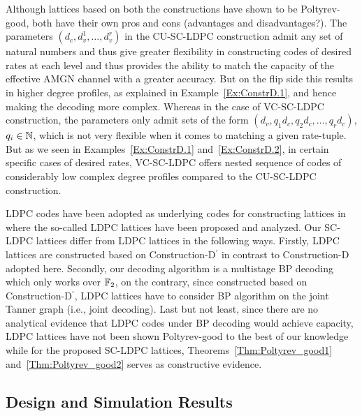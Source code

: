 \documentclass[journal,twocolumn]{IEEEtran}
\begin{document}
\begin{Discussion}
Although lattices based on both the constructions have shown to be Poltyrev-good, both have their own pros and cons (advantages and disadvantages?). The parameters $(d_{c},d_{v}^{1},\ldots,d_{v}^{r})$ in the CU-SC-LDPC construction admit any set of natural numbers and thus give greater flexibility in constructing codes of desired rates at each level and thus provides the ability to match the capacity of the effective AMGN channel with a greater accuracy. But on the flip side this results in higher degree profiles, as explained in Example~\ref{Ex:ConstrD.1}, and hence making the decoding more complex.  Whereas in the case of VC-SC-LDPC construction, the parameters only admit sets of the form $(d_{v},q_{1}d_{c},q_{2}d_{c},\ldots,q_{r}d_{c})$, $q_{i}\in\mathbb{N}$, which is not very flexible when it comes to  matching a given rate-tuple. But as we seen in Examples~\ref{Ex:ConstrD.1} and~\ref{Ex:ConstrD.2}, in certain specific cases of desired rates, VC-SC-LDPC offers nested sequence of codes of considerably low complex degree profiles compared to the CU-SC-LDPC construction.
\end{Discussion}

\begin{Remark}
    LDPC codes have been adopted as underlying codes for constructing lattices in \cite{sadeghi06} where the so-called LDPC lattices have been proposed and analyzed. Our SC-LDPC lattices differ from LDPC lattices in the following ways. Firstly, LDPC lattices are constructed based on Construction-D$^{\prime}$ \cite{BarnesSloane83} in contrast to Construction-D adopted here. Secondly, our decoding algorithm is a multistage BP decoding which only works over $\mathbb{F}_2$, on the contrary, since constructed based on Construction-D$^{\prime}$, LDPC lattices have to consider BP algorithm on the joint Tanner graph \cite{Banihashemi01} (i.e., joint decoding). Last but not least, since there are no analytical evidence that LDPC codes under BP decoding would achieve capacity, LDPC lattices have not been shown Poltyrev-good to the best of our knowledge while for the proposed SC-LDPC lattices, Theorems~\ref{Thm:Poltyrev_good1} and~\ref{Thm:Poltyrev_good2} serves as constructive evidence.
\end{Remark}


\subsection{Design and Simulation Results}
\end{document}
